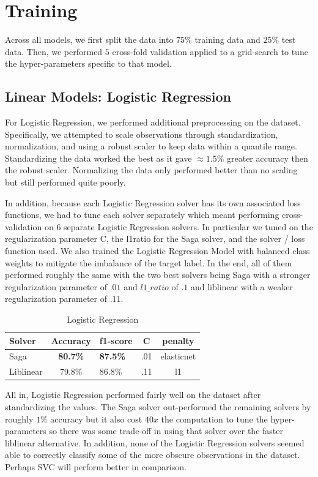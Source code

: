 \documentclass[conference]{IEEEtran}
\begin{document}
\section{Training}
Across all models, we first split the data into $75\%$ training data and $25\%$ test data. Then, we performed $5$ cross-fold validation applied to a grid-search to tune the hyper-parameters specific to that model. 

\subsection{Linear Models: Logistic Regression}
For Logistic Regression, we performed additional preprocessing on the dataset. Specifically, we attempted to scale observations through standardization, normalization, and using a robust scaler to keep data within a quantile range. Standardizing the data worked the best as it gave $\approx 1.5\%$ greater accuracy then the robust scaler. Normalizing the data only performed better than no scaling but still performed quite poorly. 

In addition, because each Logistic Regression solver has its own associated loss functions, we had to tune each solver separately which meant performing cross-validation on 6 separate Logistic Regression solvers. In particular we tuned on the regularization parameter C, the l1ratio for the Saga solver, and the solver / loss function used. We also trained the Logistic Regression Model with balanced class weights to mitigate the imbalance of the target label. In the end, all of them performed roughly the same with the two best solvers being Saga with a stronger regularization parameter of $.01$ and $l1\_ratio$ of $.1$ and liblinear with a weaker regularization parameter of $.11$.  

\begin{table}[H]
\centering
  \begin{tabular}{|l|c|l|c|c|} \hline 
 
Solver& Accuracy&  f1-score&C& penalty\\ \hline 

Saga& \textbf{80.7\%}&  \textbf{87.5\%}&.01& elasticnet\\ \hline  
Liblinear&  79.8\%&  86.8\%&.11& l1\\ \hline 
\end{tabular}

 \caption{Logistic Regression}
 \end{table}

All in, Logistic Regression performed fairly well on the dataset after standardizing the values. The Saga solver out-performed the remaining solvers by roughly $1\%$ accuracy but it also cost $40x$ the computation to tune the hyper-parameters so there was some trade-off in using that solver over the faster liblinear alternative. In addition, none of the Logistic Regression solvers seemed able to correctly classify some of the more obscure observations in the dataset. Perhaps SVC will perform better in comparison.
\end{document}

